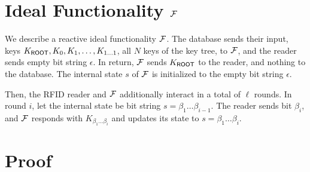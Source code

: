 \documentclass{article}
\begin{document}
\section{Ideal Functionality ${\mathcal{F}}$}
We describe a reactive ideal functionality ${\mathcal{F}}$.  The database sends
their input, keys $K_{\mathsf{ROOT}},K_0,K_1,\ldots,K_{1\ldots{}1}$, all $N$
keys of the key tree, to ${\mathcal{F}}$, and the reader sends empty bit string
$\epsilon$. In return, ${\mathcal{F}}$ sends $K_{\mathsf{ROOT}}$ to the reader, and
nothing to the database.  The internal state $s$ of ${\mathcal{F}}$ is
initialized to the empty bit string $\epsilon$.

Then, the RFID reader and ${\mathcal{F}}$ additionally interact in a total of
$\ell$ rounds. In round $i$, let the internal state be bit string
$s=\beta_1\ldots{}\beta_{i-1}$. The reader sends bit $\beta_i$, and
${\mathcal{F}}$ responds with $K_{\beta_1\ldots\beta_{i}}$ and updates its
state to $s=\beta_1\ldots\beta_{i}$.


\section{Proof}
\end{document}
